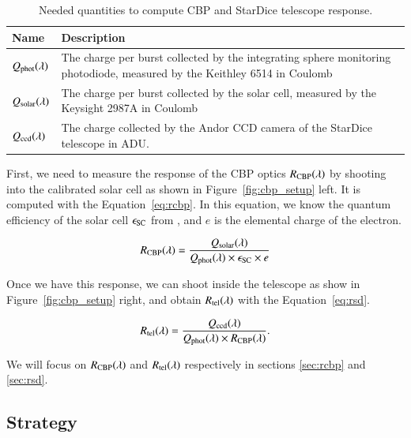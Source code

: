 \begin{table}
    \centering %
    \begin{tabular}{M{1cm} M{7cm}} %
        \hline\hline %
        Name & Description \\
        \hline
        \bf{$Q_{\mathrm{phot}}(\lambda)$} & The charge per burst collected by the integrating sphere monitoring photodiode, measured by the Keithley 6514 in Coulomb \\

        \bf{$Q_{\mathrm{solar}}(\lambda)$} & The charge per burst collected by the solar cell, measured by the Keysight 2987A in Coulomb \\
        \bf{$Q_{\mathrm{ccd}}(\lambda)$} & The charge collected by the Andor CCD camera of the StarDice telescope in ADU. \\
        \hline %
    \end{tabular}
    \caption{Needed quantities to compute CBP and StarDice telescope response.}
    \label{tab:quantities} %
\end{table}

First, we need to measure the response of the CBP optics $R_{\mathrm{CBP}}(\lambda)$ by shooting into the calibrated solar cell as shown in Figure~\ref{fig:cbp_setup} left. It is computed with the Equation~\ref{eq:rcbp}. In this equation, we know the quantum efficiency of the solar cell $\epsilon_{\mathrm{SC}}$ from \cite{solarcell}, and $e$ is the elemental charge of the electron.

\begin{equation}
    R_{\mathrm{CBP}}(\lambda) = \frac{Q_{\mathrm{solar}}(\lambda)}{Q_{\mathrm{phot}}(\lambda) \times \epsilon_{\mathrm{SC}} \times e}
    \label{eq:rcbp}
\end{equation} 

Once we have this response, we can shoot inside the \SD telescope as show in Figure~\ref{fig:cbp_setup} right, and obtain $R_{\mathrm{tel}}(\lambda)$ with the Equation~\ref{eq:rsd}.

\begin{equation}
    R_{\mathrm{tel}}(\lambda) = \frac{Q_{\mathrm{ccd}}(\lambda)}{Q_{\mathrm{phot}}(\lambda) \times R_{\mathrm{CBP}}(\lambda)}.
    \label{eq:rsd}
\end{equation}

We will focus on $R_{\mathrm{CBP}}(\lambda)$ and $R_{\mathrm{tel}}(\lambda)$ respectively in sections \ref{sec:rcbp} and \ref{sec:rsd}.

\subsection{Strategy}
\label{sec:strategy}

